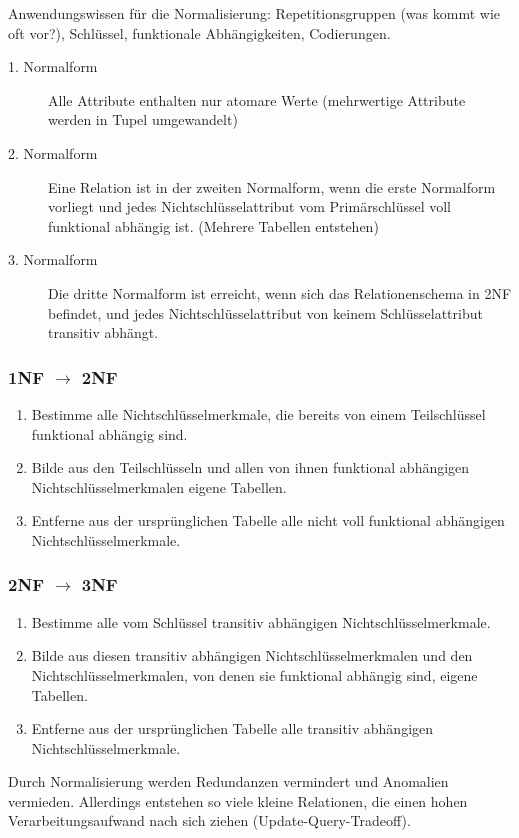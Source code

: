 Anwendungswissen für die Normalisierung: Repetitionsgruppen (was kommt wie oft vor?), Schlüssel, funktionale Abhängigkeiten,
Codierungen.

\begin{description}
	\item [1. Normalform] Alle Attribute enthalten nur atomare Werte (mehrwertige Attribute werden in Tupel umgewandelt)
	\item [2. Normalform] Eine Relation ist in der zweiten Normalform, wenn die erste Normalform vorliegt 
	und jedes Nichtschlüsselattribut vom Primärschlüssel voll funktional abhängig ist. (Mehrere Tabellen entstehen)
	\item [3. Normalform] Die dritte Normalform ist erreicht, wenn sich das Relationenschema in 2NF befindet, und jedes 
	Nichtschlüsselattribut von keinem Schlüsselattribut transitiv abhängt.
\end{description}

\subsubsection{1NF $\rightarrow$ 2NF}
\begin{enumerate}
	\item Bestimme alle Nichtschlüsselmerkmale, die bereits von einem Teilschlüssel funktional abhängig sind.
	\item Bilde aus den Teilschlüsseln und allen von ihnen funktional abhängigen Nichtschlüsselmerkmalen eigene Tabellen.
	\item Entferne aus der ursprünglichen Tabelle alle nicht voll funktional abhängigen Nichtschlüsselmerkmale.
\end{enumerate}

\subsubsection{2NF $\rightarrow$ 3NF}
\begin{enumerate}
	\item Bestimme alle vom Schlüssel transitiv abhängigen Nichtschlüsselmerkmale.
	\item Bilde aus diesen transitiv abhängigen Nichtschlüsselmerkmalen und den Nichtschlüsselmerkmalen, 
	von denen sie funktional abhängig sind, eigene Tabellen.
	\item Entferne aus der ursprünglichen Tabelle alle transitiv abhängigen Nichtschlüsselmerkmale.
\end{enumerate}

Durch Normalisierung werden Redundanzen vermindert und Anomalien vermieden. Allerdings entstehen so 
viele kleine Relationen, die einen hohen Verarbeitungsaufwand nach sich ziehen (Update-Query-Tradeoff).